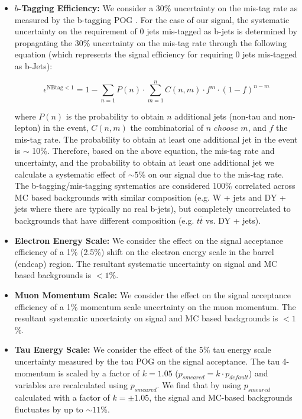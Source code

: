\begin{itemize}
  \item \textbf{$b$-Tagging Efficiency:} We consider a 30\% uncertainty on the mis-tag rate as measured by the 
b-tagging POG \cite{CMS_PAS_BTV_11-001}. For the case of our signal, the systematic 
uncertainty on the requirement of 0 jets mis-tagged as b-jets is determined by propagating the 30\% uncertainty on the 
mis-tag rate through the following equation (which represents the signal efficiency for requiring 0 
jets mis-tagged as b-Jets):

\begin{equation}\label{eq:nttbar}
  \epsilon^{\textrm{NBtag} < 1} = 1 - \sum_{n=1} P(n) \cdot \sum_{m=1}^{n} C(n,m) \cdot f^{m} \cdot (1-f)^{n-m}
\end{equation}

where $P(n)$ is the probability to obtain $n$ additional jets (non-tau and non-lepton) in the event, $C(n,m)$ the 
combinatorial of $n$ $choose$ $m$, and $f$ the mis-tag rate. The probability to 
obtain at least one additional jet in the event is $\sim$ 10\%. Therefore, based on the above equation, the 
mis-tag rate and uncertainty, and the probability to obtain at least one additional jet we calculate a 
systematic effect of $\sim 5$\% on our signal due to the mis-tag rate. The b-tagging/mis-tagging systematics are considered 100\% correlated across MC based 
backgrounds with similar composition (e.g. W + jets and DY + jets where there are typically no real b-jets), but completely uncorrelated to backgrounds that have 
different composition (e.g. $t\bar{t}$ vs. DY + jets).

  \item \textbf{Electron Energy Scale:} We consider the effect on the signal acceptance efficiency of a 1\% (2.5\%) shift on the electron
  energy scale in the barrel (endcap) region. The resultant systematic uncertainty on signal and MC based backgrounds is $< 1$\%.

  \item \textbf{Muon Momentum Scale:} We consider the effect on the signal acceptance efficiency of a 1\% momentum scale uncertainty on the
  muon momentum. The resultant systematic uncertainty on signal and MC based backgrounds is $< 1$\%.

  \item \textbf{Tau Energy Scale:} We consider the effect of the 5\% tau energy scale uncertainty measured by the tau 
POG on the signal acceptance. The tau 4-momentum is scaled by a factor of $k=1.05$ ($p_{smeared} = k \cdot 
p_{default}$) and variables are recalculated using $p_{smeared}$. We find that by using $p_{smeared}$ calculated with 
a factor of $k=\pm 1.05$, the signal and MC-based backgrounds fluctuates by up to $\sim 11$\%. 


\end{itemize}

